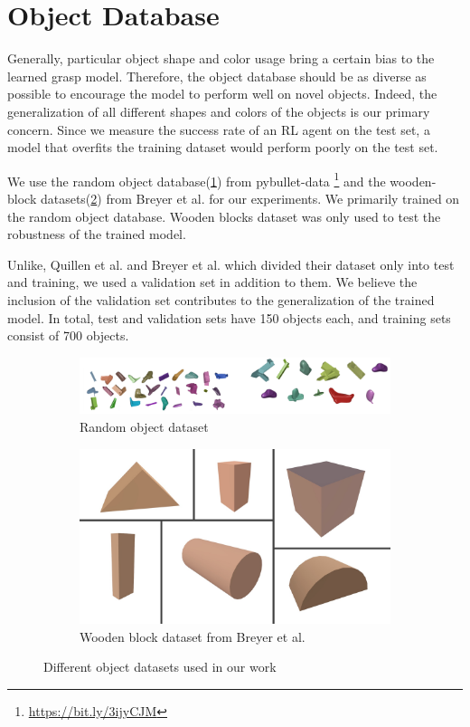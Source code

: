 \section{Object Database}

Generally, particular object shape and color usage bring a certain bias to the learned grasp model. Therefore, the object database should be as diverse as possible to encourage the model to perform well on novel objects. Indeed, the generalization of all different shapes and colors of the objects is our primary concern. Since we measure the success rate of an RL agent on the test set, a model that overfits the training dataset would perform poorly on the test set.

We use the random object database(\ref{fig:randomobj}) from pybullet-data \footnote{\url{https://bit.ly/3ijyCJM}} and the wooden-block datasets(\ref{fig:woodenobj}) from Breyer et al. for our experiments. We primarily trained on the random object database. Wooden blocks dataset was only used to test the robustness of the trained model.

Unlike, Quillen et al. and Breyer et al. which divided their dataset only into test and training, we used a validation set in addition to them.  We believe the inclusion of the validation set contributes to the generalization of the trained model. In total, test and validation sets have 150 objects each, and training sets consist of 700 objects.

\begin{figure}

    \begin{subfigure}{1.0\textwidth}
      \includegraphics[width=\linewidth]{figures/random_objects}
      \caption{Random object dataset} \label{fig:randomobj}
    \end{subfigure}%
    \hspace*{\fill}   %
    \newline
    \begin{subfigure}{1.0\textwidth}
      \centering
      \includegraphics[width=0.3\linewidth]{figures/wooden_blocks}
      \caption{Wooden block dataset from Breyer et al. \cite{Breyer2018}} \label{fig:woodenobj}
    \end{subfigure}%
    \hspace*{\fill}   %
\caption{ Different object datasets used in our work \label{fig:objdatasets}}
\end{figure}